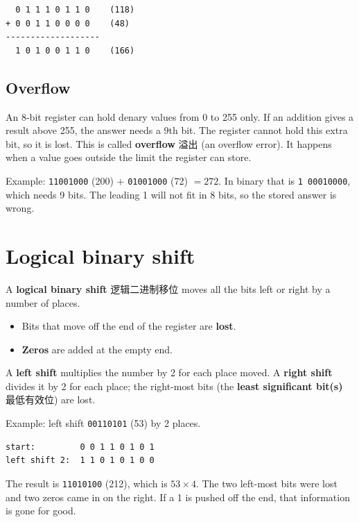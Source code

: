 \documentclass[11pt]{article}
\begin{document}
\begin{Verbatim}
  0 1 1 1 0 1 1 0    (118)
+ 0 0 1 1 0 0 0 0    (48)
-------------------
  1 0 1 0 0 1 1 0    (166)
\end{Verbatim}

\subsection*{Overflow}

An 8-bit register can hold denary values from 0 to 255 only. If an addition gives a result above 255, the answer needs a 9th bit. The register cannot hold this extra bit, so it is lost. This is called \textbf{overflow} 溢出 (an overflow error). It happens when a value goes outside the limit the register can store.

Example: \texttt{11001000} (200) $+$ \texttt{01001000} (72) $= 272$. In binary that is \texttt{1 00010000}, which needs 9 bits. The leading 1 will not fit in 8 bits, so the stored answer is wrong.

\section*{Logical binary shift}

A \textbf{logical binary shift} 逻辑二进制移位 moves all the bits left or right by a number of places.

\begin{itemize}
\item Bits that move off the end of the register are \textbf{lost}.

\item \textbf{Zeros} are added at the empty end.

\end{itemize}

A \textbf{left shift} multiplies the number by 2 for each place moved. A \textbf{right shift} divides it by 2 for each place; the right-most bits (the \textbf{least significant bit(s)} 最低有效位) are lost.

Example: left shift \texttt{00110101} (53) by 2 places.

\begin{Verbatim}
start:         0 0 1 1 0 1 0 1
left shift 2:  1 1 0 1 0 1 0 0
\end{Verbatim}

The result is \texttt{11010100} (212), which is $53 \times 4$. The two left-most bits were lost and two zeros came in on the right. If a 1 is pushed off the end, that information is gone for good.
\end{document}
